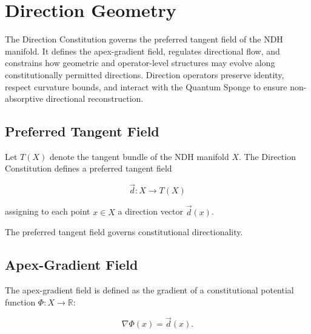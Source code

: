 
\section{Direction Geometry}
\label{sec:direction-geometry}

The Direction Constitution governs the preferred tangent field of the NDH
manifold. It defines the apex-gradient field, regulates directional flow,
and constrains how geometric and operator-level structures may evolve along
constitutionally permitted directions. Direction operators preserve identity,
respect curvature bounds, and interact with the Quantum Sponge to ensure
non-absorptive directional reconstruction.


\subsection{Preferred Tangent Field}

Let $T(X)$ denote the tangent bundle of the NDH manifold $X$. The Direction
Constitution defines a preferred tangent field

\[
\vec{d} : X \to T(X)
\]

assigning to each point $x \in X$ a direction vector $\vec{d}(x)$.

The preferred tangent field governs constitutional directionality.


\subsection{Apex-Gradient Field}

The apex-gradient field is defined as the gradient of a constitutional
potential function $\Phi : X \to \mathbb{R}$:

\[
\nabla \Phi(x) = \vec{d}(x).
\]


